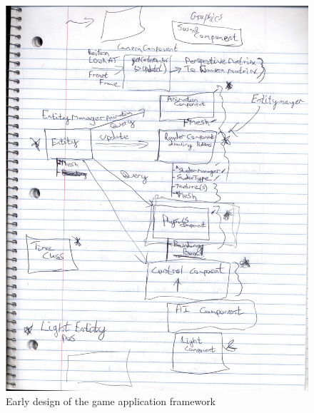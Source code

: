 \documentclass{article}
\theoremstyle{definition}
\begin{document}
\begin{figure}[htpb]
  \centering
  \includegraphics[width=0.8\linewidth]{images/Brainstorming_002.jpg}
  \caption{Early design of the game application framework}
\label{fig:Brainstorming_002}
\end{figure}
\end{document}
